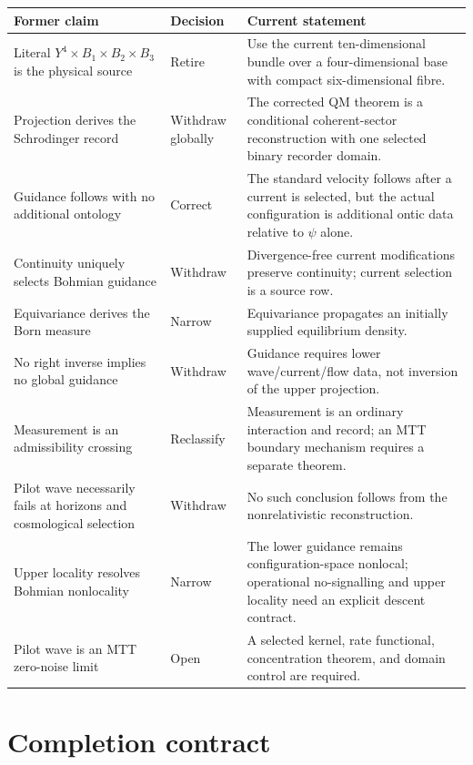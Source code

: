 \documentclass[11pt]{article}
\theoremstyle{definition}
\theoremstyle{remark}
\begin{document}
\begin{center}
\small
\begin{tabularx}{\textwidth}{@{}
>{\raggedright\arraybackslash}p{}
>{\raggedright\arraybackslash}p{}
>{\raggedright\arraybackslash}X@{}}
\toprule
Former claim & Decision & Current statement \\
\midrule
Literal \(Y^4\times B_1\times B_2\times B_3\) is the physical source
& Retire
& Use the current ten-dimensional bundle over a four-dimensional base with
  compact six-dimensional fibre. \\
Projection derives the Schrodinger record
& Withdraw globally
& The corrected QM theorem is a conditional coherent-sector reconstruction
  with one selected binary recorder domain. \\
Guidance follows with no additional ontology
& Correct
& The standard velocity follows after a current is selected, but the actual
  configuration is additional ontic data relative to \(\psi\) alone. \\
Continuity uniquely selects Bohmian guidance
& Withdraw
& Divergence-free current modifications preserve continuity; current
  selection is a source row. \\
Equivariance derives the Born measure
& Narrow
& Equivariance propagates an initially supplied equilibrium density. \\
No right inverse implies no global guidance
& Withdraw
& Guidance requires lower wave/current/flow data, not inversion of the
  upper projection. \\
Measurement is an admissibility crossing
& Reclassify
& Measurement is an ordinary interaction and record; an MTT boundary
  mechanism requires a separate theorem. \\
Pilot wave necessarily fails at horizons and cosmological selection
& Withdraw
& No such conclusion follows from the nonrelativistic reconstruction. \\
Upper locality resolves Bohmian nonlocality
& Narrow
& The lower guidance remains configuration-space nonlocal; operational
  no-signalling and upper locality need an explicit descent contract. \\
Pilot wave is an MTT zero-noise limit
& Open
& A selected kernel, rate functional, concentration theorem, and domain
  control are required. \\
\bottomrule
\end{tabularx}
\end{center}

\section{Completion contract}
\label{sec:completion}
\end{document}
